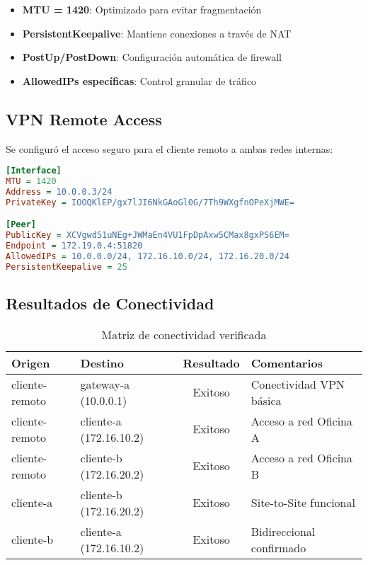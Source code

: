 \begin{exito}
\begin{itemize}
    \item \textbf{MTU = 1420}: Optimizado para evitar fragmentación
    \item \textbf{PersistentKeepalive}: Mantiene conexiones a través de NAT
    \item \textbf{PostUp/PostDown}: Configuración automática de firewall
    \item \textbf{AllowedIPs específicas}: Control granular de tráfico
\end{itemize}
\end{exito}

\subsection{VPN Remote Access}

Se configuró el acceso seguro para el cliente remoto a ambas redes internas:

\begin{lstlisting}[language=ini, caption=Configuración Cliente Remoto]
[Interface]
MTU = 1420
Address = 10.0.0.3/24
PrivateKey = IOOQKlEP/gx7lJI6NkGAoGl0G/7Th9WXgfnOPeXjMWE=

[Peer]
PublicKey = XCVgwd51uNEg+JWMaEn4VU1FpDpAxw5CMax8gxPS6EM=
Endpoint = 172.19.0.4:51820
AllowedIPs = 10.0.0.0/24, 172.16.10.0/24, 172.16.20.0/24
PersistentKeepalive = 25
\end{lstlisting}

\subsection{Resultados de Conectividad}

\begin{table}[H]
\centering
\caption{Matriz de conectividad verificada}
\label{tab:conectividad}
\begin{tabular}{llcl}
\toprule
\textbf{Origen} & \textbf{Destino} & \textbf{Resultado} & \textbf{Comentarios} \\
\midrule
cliente-remoto & gateway-a (10.0.0.1) & \color{green} Exitoso & Conectividad VPN básica \\
cliente-remoto & cliente-a (172.16.10.2) & \color{green} Exitoso & Acceso a red Oficina A \\
cliente-remoto & cliente-b (172.16.20.2) & \color{green} Exitoso & Acceso a red Oficina B \\
cliente-a & cliente-b (172.16.20.2) & \color{green} Exitoso & Site-to-Site funcional \\
cliente-b & cliente-a (172.16.10.2) & \color{green} Exitoso & Bidireccional confirmado \\
\bottomrule
\end{tabular}
\end{table}
